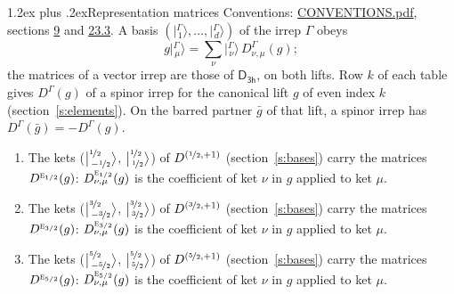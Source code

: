 \documentclass[10pt,a4paper]{article}
\makeatletter
\renewcommand\section{\@startsection{section}{1}{\z@}{-3ex plus -1ex minus -.2ex}%
  {1.2ex plus .2ex}{\normalfont\large\sffamily\bfseries\color{parttitle}}}
\numberwithin{equation}{section}
\newcommand{\grp}[1]{\mathsf{#1}}
\newcommand{\irr}[1]{\text{\normalfont\scshape #1}}
\newcommand{\irrJp}[2]{D^{(#1,#2)}}
\newcommand{\repD}[1]{D^{#1}}
\newcommand{\intx}{\mu}
\newcommand{\jm}[2]{\bigl\lvert{}^{#1}_{\,#2}\bigr\rangle}
\newcommand{\irket}[2]{\bigl\lvert{}^{#1}_{\,#2}\bigr\rangle}
\newcommand{\barred}[1]{\bar{#1}}
\newenvironment{romanlist}{\begin{enumerate}%
\renewcommand{\labelenumi}{(\roman{enumi})}}%
  {\end{enumerate}}
\makeatother
\begin{document}
\section{Representation matrices}\label{s:irrep_matrices}
Conventions: \href{../../CONVENTIONS.pdf}{CONVENTIONS.pdf}, sections \href{../../../rotation/CONVENTIONS.pdf\#conv.9}{9} and \href{../../CONVENTIONS.pdf\#conv.23.3}{23.3}.
\leavevmode\label{n:vector.ket.partner}\label{n:index.partner}\label{n:matrix.irrep}\label{n:index.partner.summed}A basis $(\irket{\Gamma}{1}, \dots, \irket{\Gamma}{d})$ of the irrep $\Gamma$ obeys
\begin{equation}\label{e:partner}g\irket{\Gamma}{\intx} = \sum_\nu \irket{\Gamma}{\nu}\, \repD{\Gamma}_{\nu,\intx}(g);\end{equation}
the matrices of a vector irrep are those of \href{../../../rotation/data/pdf/D3h.pdf}{$\grp{D_{3h}}$}, on both lifts. Row $k$ of each table gives $\repD{\Gamma}(g)$ of a spinor irrep for the canonical lift $g$ of even index $k$ (section~\ref{s:elements}). On the barred partner $\barred{g}$ of that lift, a spinor irrep has $\repD{\Gamma}(\barred{g}) = -\repD{\Gamma}(g)$.
\begin{romanlist}\raggedright
\item The kets ($\jm{\nicefrac{1}{2}}{-\nicefrac{1}{2}}$, $\jm{\nicefrac{1}{2}}{\nicefrac{1}{2}}$) of $\irrJp{\nicefrac{1}{2}}{+1}$ (section~\ref{s:bases}) carry the matrices $\repD{\irr{e}_{1/2}}(g)$: $\repD{\irr{e}_{1/2}}_{\nu,\intx}(g)$ is the coefficient of ket $\nu$ in $g$ applied to ket $\intx$.
\item The kets ($\jm{\nicefrac{3}{2}}{-\nicefrac{3}{2}}$, $\jm{\nicefrac{3}{2}}{\nicefrac{3}{2}}$) of $\irrJp{\nicefrac{3}{2}}{+1}$ (section~\ref{s:bases}) carry the matrices $\repD{\irr{e}_{3/2}}(g)$: $\repD{\irr{e}_{3/2}}_{\nu,\intx}(g)$ is the coefficient of ket $\nu$ in $g$ applied to ket $\intx$.
\item The kets ($\jm{\nicefrac{5}{2}}{-\nicefrac{5}{2}}$, $\jm{\nicefrac{5}{2}}{\nicefrac{5}{2}}$) of $\irrJp{\nicefrac{5}{2}}{+1}$ (section~\ref{s:bases}) carry the matrices $\repD{\irr{e}_{5/2}}(g)$: $\repD{\irr{e}_{5/2}}_{\nu,\intx}(g)$ is the coefficient of ket $\nu$ in $g$ applied to ket $\intx$.
\end{romanlist}
\end{document}
